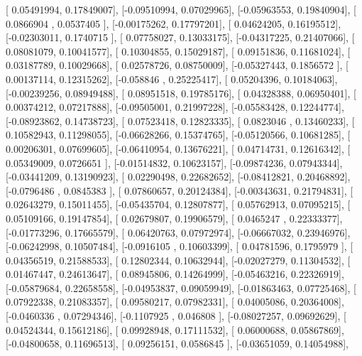 \documentclass{article}
\begin{document}
       [ 0.05491994,  0.17849007],
       [-0.09510994,  0.07029965],
       [-0.05963553,  0.19840904],
       [ 0.0866904 ,  0.0537405 ],
       [-0.00175262,  0.17797201],
       [ 0.04624205,  0.16195512],
       [-0.02303011,  0.1740715 ],
       [ 0.07758027,  0.13033175],
       [-0.04317225,  0.21407066],
       [ 0.08081079,  0.10041577],
       [ 0.10304855,  0.15029187],
       [ 0.09151836,  0.11681024],
       [ 0.03187789,  0.10029668],
       [ 0.02578726,  0.08750009],
       [-0.05327443,  0.1856572 ],
       [ 0.00137114,  0.12315262],
       [-0.058846  ,  0.25225417],
       [ 0.05204396,  0.10184063],
       [-0.00239256,  0.08949488],
       [ 0.08951518,  0.19785176],
       [ 0.04328388,  0.06950401],
       [ 0.00374212,  0.07217888],
       [-0.09505001,  0.21997228],
       [-0.05583428,  0.12244774],
       [-0.08923862,  0.14738723],
       [ 0.07523418,  0.12823335],
       [ 0.0823046 ,  0.13460233],
       [ 0.10582943,  0.11298055],
       [-0.06628266,  0.15374765],
       [-0.05120566,  0.10681285],
       [ 0.00206301,  0.07699605],
       [-0.06410954,  0.13676221],
       [ 0.04714731,  0.12616342],
       [ 0.05349009,  0.0726651 ],
       [-0.01514832,  0.10623157],
       [-0.09874236,  0.07943344],
       [-0.03441209,  0.13190923],
       [ 0.02290498,  0.22682652],
       [-0.08412821,  0.20468892],
       [-0.0796486 ,  0.0845383 ],
       [ 0.07860657,  0.20124384],
       [-0.00343631,  0.21794831],
       [ 0.02643279,  0.15011455],
       [-0.05435704,  0.12807877],
       [ 0.05762913,  0.07095215],
       [ 0.05109166,  0.19147854],
       [ 0.02679807,  0.19906579],
       [ 0.0465247 ,  0.22333377],
       [-0.01773296,  0.17665579],
       [ 0.06420763,  0.07972974],
       [-0.06667032,  0.23946976],
       [-0.06242998,  0.10507484],
       [-0.0916105 ,  0.10603399],
       [ 0.04781596,  0.1795979 ],
       [ 0.04356519,  0.21588533],
       [ 0.12802344,  0.10632944],
       [-0.02027279,  0.11304532],
       [ 0.01467447,  0.24613647],
       [ 0.08945806,  0.14264999],
       [-0.05463216,  0.22326919],
       [-0.05879684,  0.22658558],
       [-0.04953837,  0.09059949],
       [-0.01863463,  0.07725468],
       [ 0.07922338,  0.21083357],
       [ 0.09580217,  0.07982331],
       [ 0.04005086,  0.20364008],
       [-0.0460336 ,  0.07294346],
       [-0.1107925 ,  0.046808  ],
       [-0.08027257,  0.09692629],
       [ 0.04524344,  0.15612186],
       [ 0.09928948,  0.17111532],
       [ 0.06000688,  0.05867869],
       [-0.04800658,  0.11696513],
       [ 0.09256151,  0.0586845 ],
       [-0.03651059,  0.14054988],
\end{document}
